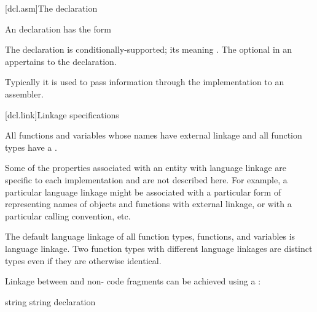 \documentclass{wg21}
\begin{document}
[dcl.asm]{The  declaration}%
%
%

\pnum
An  declaration has the form

\begin{bnf}
    \br
      \terminal{(}  \terminal{)} \terminal{;}
\end{bnf}

The  declaration is conditionally-supported;  its meaning 
.
The optional  in
an  appertains to the  declaration.
\begin{note}
    Typically it is used to pass information through the implementation to
    an assembler.
\end{note}

[dcl.link]{Linkage specifications}%

\pnum
All functions and variables whose names have external linkage
and all function types
have a .
\begin{note}
    Some of the properties associated with an entity with language linkage
    are specific to each implementation and are not described here. For
    example, a particular language linkage might be associated with a
    particular form of representing names of objects and functions with
    external linkage, or with a particular calling convention, etc.
\end{note}
The default language linkage of all function types, functions, and
variables is \Cpp{} language linkage. Two function types with
different language linkages are distinct types even if they are
otherwise identical.

\pnum
Linkage between \Cpp{} and  non-\Cpp{} code fragments can
be achieved using a :

%
%
%
\begin{bnf}
    \br
     string \terminal{\{}  \terminal{\}}\br
     string declaration
\end{bnf}
\end{document}
